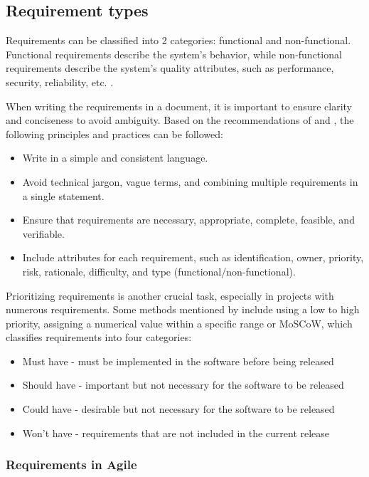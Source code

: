 \subsection{Requirement types}

Requirements can be classified into 2 categories: functional and non-functional. Functional requirements describe the system's behavior, while non-functional requirements describe the system's quality attributes, such as performance, security, reliability, etc. \parencite[6]{requirements}.

When writing the requirements in a document, it is important to ensure clarity and conciseness to avoid ambiguity. Based on the recommendations of \textcite[112]{requirements} and \textcite{requirements2}, the following principles and practices can be followed:  
\begin{itemize}
    \item Write in a simple and consistent language.
    \item Avoid technical jargon, vague terms, and combining multiple requirements in a single statement.
    \item Ensure that requirements are necessary, appropriate, complete, feasible, and verifiable.
    \item Include attributes for each requirement, such as identification, owner, priority, risk, rationale, difficulty, and type (functional/non-functional).
\end{itemize}

Prioritizing requirements is another crucial task, especially in projects with numerous requirements. Some methods mentioned by \textcite{moscow} include using a low to high priority, assigning a numerical value within a specific range or MoSCoW, which classifies requirements into four categories: 
\begin{itemize}
    \item Must have - must be implemented in the software before being released
    \item Should have - important but not necessary for the software to be released
    \item Could have - desirable but not necessary for the software to be released
    \item Won't have - requirements that are not included in the current release
\end{itemize}

\subsubsection{Requirements in Agile}

